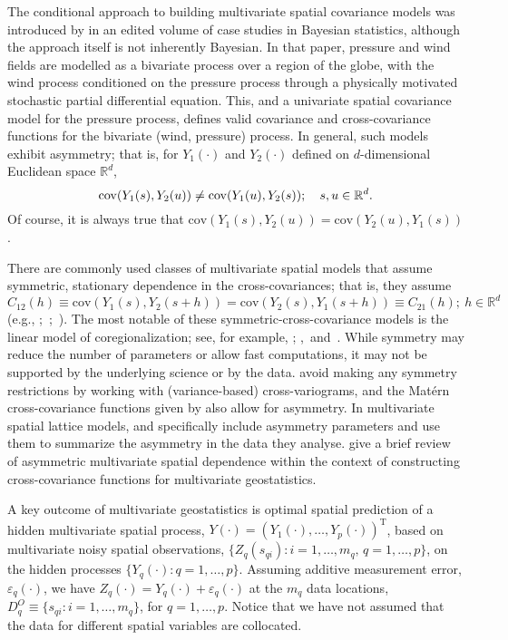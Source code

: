 \documentclass[lineno]{biometrika}
\def\T{{ \mathrm{\scriptscriptstyle T} }}
\newcommand{\svec} {s}
\newcommand{\uvec} {u}
\newcommand{\s}{s}
\newcommand{\h}{h}
\renewcommand{\u}{u}
\newcommand{\Y}{Y}
\newcommand{\cov}{\mathrm{cov}}
\let\originalleft\left
\let\originalright\right
\renewcommand{\left}{\mathopen{}\mathclose\bgroup\originalleft}
\renewcommand{\right}{\aftergroup\egroup\originalright}
\begin{document}
The conditional approach to building multivariate spatial covariance models was introduced by \citet{Royleetal1999} in an edited volume of case studies in Bayesian statistics, although the approach itself is not inherently Bayesian. In that paper, pressure and wind fields are modelled as a bivariate process over a region of the globe, with the wind process conditioned on the pressure process through a physically motivated stochastic partial differential equation. This, and a univariate spatial covariance model for the pressure process, defines valid covariance and cross-covariance functions for the bivariate (wind, pressure) process. In general, such models exhibit asymmetry; that is, for $Y_1(\cdot)$ and $Y_2(\cdot)$ defined on $d$-dimensional Euclidean space $\mathbb{R}^d$,
\begin{equation*}
\cov\left(Y_1(\s),Y_2(\u)\right)\neq \cov(Y_1(\u),Y_2(\s));\quad \svec,\uvec \in \mathbb{R}^d.
\end{equation*}
Of course, it is always true that  $\cov(Y_1(\svec),Y_2(\uvec)) = \cov(Y_2(\uvec),Y_1(\svec))$.

There are commonly used classes of multivariate spatial models that assume symmetric, stationary dependence in the cross-covariances; that is, they assume $C_{12}(\h)\equiv\cov(Y_1(\s),Y_2(\s+\h))=\cov(Y_2(\s),Y_1(\s+\h))\equiv C_{21}(\h);~\h \in \mathbb{R}^d$ (e.g., \citealp{Gelfandetal2004};~\citealp[Section 4.1.5]{CressieWikle2011};~\citealp{GentonKleiber2015}). The most notable of these symmetric-cross-covariance models is the linear model of coregionalization; see, for example, \citet[][Section III.B.3]{JournelHuijbregts1978}; \citet{Websteretal1994,Wackernagel1995},~and~\citet[Section~7.2]{Banerjeeetal2004}. While symmetry may reduce the number of parameters or allow fast computations, it may not be supported by the underlying science or by the data. \citet{VerHoefCressie1993} avoid making any symmetry restrictions by working with (variance-based) cross-variograms, and the Mat\'{e}rn cross-covariance functions given by \citet{Gneitingetal2010} also allow for asymmetry. In multivariate spatial lattice models, \citet{SainCressie2007} and \citet{Sainetal2011} specifically include asymmetry parameters and use them to summarize the asymmetry in the data they analyse. \citet{GentonKleiber2015} give a brief review of asymmetric multivariate spatial dependence within the context of constructing cross-covariance functions for multivariate geostatistics. 

A key outcome of multivariate geostatistics is optimal spatial prediction of a hidden multivariate spatial process, $\Y(\cdot)=(Y_1(\cdot),\ldots,Y_p(\cdot))^\T$, based on multivariate noisy spatial observations, $\{Z_q(\s_{qi}):i=1,\ldots,m_q,\,q=1,\ldots,p\}$, on the hidden processes $\{Y_q(\cdot): q = 1,\dots,p\}$. Assuming additive measurement error, $\varepsilon_{q}(\cdot)$, we have $Z_q(\cdot)=Y_q(\cdot)+\varepsilon_q(\cdot)$ at the $m_q$ data locations, $D_q^O \equiv \{\s_{qi}:i=1,\ldots,m_q\}$, for $q=1,\ldots,p$. Notice that we have not assumed that the data for different spatial variables are collocated.
\end{document}
